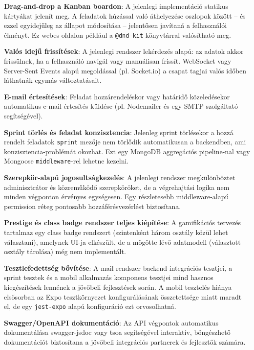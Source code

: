 \textbf{Drag-and-drop a Kanban boardon}: A jelenlegi implementáció statikus kártyákat jelenít meg. A feladatok húzással való áthelyezése oszlopok között -- és ezzel egyidejűleg az állapot módosítása -- jelentősen javítaná a felhasználói élményt. Ez webes oldalon például a \texttt{@dnd-kit} könyvtárral valósítható meg.

\textbf{Valós idejű frissítések}: A jelenlegi rendszer lekérdezés alapú: az adatok akkor frissülnek, ha a felhasználó navigál vagy manuálisan frissít. WebSocket vagy Server-Sent Events alapú megoldással (pl. Socket.io) a csapat tagjai valós időben láthatnák egymás változtatásait.

\textbf{E-mail értesítések}: Feladat hozzárendeléskor vagy határidő közeledésekor automatikus e-mail értesítés küldése (pl. Nodemailer és egy SMTP szolgáltató segítségével).

\textbf{Sprint törlés és feladat konzisztencia}: Jelenleg sprint törlésekor a hozzá rendelt feladatok \texttt{sprint} mezője nem törlődik automatikusan a backendben, ami konzisztencia-problémát okozhat. Ezt egy MongoDB aggregációs pipeline-nal vagy Mongoose \texttt{mid\-dle\-ware}-rel lehetne kezelni.

\textbf{Szerepkör-alapú jogosultságkezelés}: A jelenlegi rendszer megkülönböztet adminisztrátor és közreműködő szerepköröket, de a végrehajtási logika nem minden végponton érvényes egységesen. Egy részletesebb middleware-alapú permission réteg pontosabb hozzáférésvezérlést biztosítana.

\textbf{Prestige és class badge rendszer teljes kiépítése}: A gamifikációs tervezés tartalmaz egy class badge rendszert (szintenként három osztály közül lehet választani), amelynek UI-ja elkészült, de a mögötte lévő adatmodell (választott osztály tárolása) még nem implementált.

\textbf{Tesztlefedettség bővítése}: A mail rendszer backend integrációs tesztjei, a sprint tesztek és a mobil alkalmazás komponens tesztjei mind hasznos kiegészítések lennének a jövőbeli fejlesztések során. A mobil tesztelés hiánya elsősorban az Expo tesztkörnyezet konfigurálásának összetettsége miatt maradt el, de egy \texttt{jest-expo} alapú konfiguráció ezt orvosolhatná.

\textbf{Swagger/OpenAPI dokumentáció}: Az API végpontok automatikus dokumentálása swagger-jsdoc vagy tsoa segítségével interaktív, böngészhető dokumentációt biztosítana a jövőbeli integrációs partnerek és fejlesztők számára.
